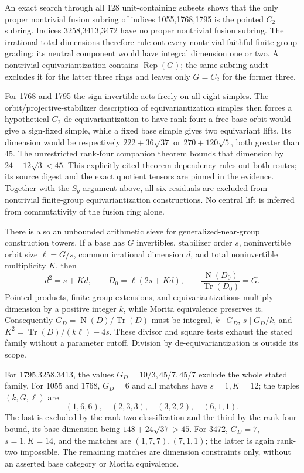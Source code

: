 An exact search through all 128 unit-containing subsets shows that the
only proper nontrivial fusion subring of indices 1055,1768,1795 is the
pointed $C_2$ subring. Indices 3258,3413,3472 have no proper nontrivial
fusion subring. The irrational total dimensions therefore rule out every
nontrivial faithful finite-group grading: its neutral component would
have integral dimension one or two. A nontrivial equivariantization
contains $\operatorname{Rep}(G)$; the same subring audit excludes it for
the latter three rings and leaves only $G=C_2$ for the former three.

For 1768 and 1795 the sign invertible acts freely on all eight simples.
The orbit/projective-stabilizer description of equivariantization simples
then forces a hypothetical $C_2$-de-equivariantization to have rank four:
a free base orbit would give a sign-fixed simple, while a fixed base simple
gives two equivariant lifts. Its dimension would be respectively
$222+36\sqrt{37}$ or $270+120\sqrt5$, both greater than $45$.
The unrestricted rank-four companion theorem bounds that dimension by
$24+12\sqrt3<45$. This explicitly cited theorem dependency rules out both
routes; its source digest and the exact quotient tensors are pinned in
the evidence. Together with the $S_g$ argument above, all six residuals
are excluded from nontrivial finite-group equivariantization constructions.
No central lift is inferred from commutativity of the fusion ring alone.

There is also an unbounded arithmetic sieve for generalized-near-group
construction towers. If a base has $G$ invertibles, stabilizer order $s$,
noninvertible orbit size $\ell=G/s$, common irrational dimension $d$, and
total noninvertible multiplicity $K$, then
\[
 d^2=s+Kd,\qquad D_0=\ell(2s+Kd),\qquad
 \frac{\operatorname{N}(D_0)}{\operatorname{Tr}(D_0)}=G.
\]
Pointed products, finite-group extensions, and equivariantizations multiply
dimension by a positive integer $k$, while Morita equivalence preserves it.
Consequently $G_D=\operatorname{N}(D)/\operatorname{Tr}(D)$ must be integral,
$k\mid G_D$, $s\mid G_D/k$, and
$K^2=\operatorname{Tr}(D)/(k\ell)-4s$. These divisor and square tests
exhaust the stated family without a parameter cutoff. Division by
de-equivariantization is outside its scope.

For 1795,3258,3413, the values $G_D=10/3,45/7,45/7$ exclude the whole
stated family. For 1055 and 1768, $G_D=6$ and all matches have $s=1,K=12$;
the tuples $(k,G,\ell)$ are
\[
 (1,6,6),\quad (2,3,3),\quad (3,2,2),\quad (6,1,1).
\]
The last is excluded by the rank-two classification and the third by the
rank-four bound, its base dimension being $148+24\sqrt{37}>45$.
For 3472, $G_D=7$, $s=1,K=14$, and the matches are $(1,7,7),(7,1,1)$;
the latter is again rank-two impossible. The remaining matches are
dimension constraints only, without an asserted base category or Morita
equivalence.


